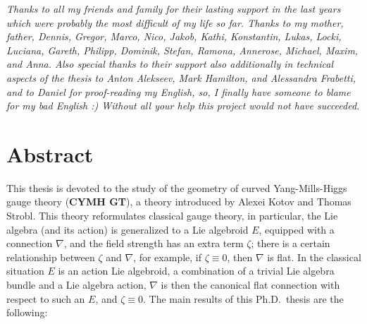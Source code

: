 \documentclass[a4paper,twoside,11pt]{scrbook}
\theoremstyle{plain}
\theoremstyle{remark}
\theoremstyle{definition}
\begin{document}

\newpage
\thispagestyle{empty}
\vspace*{\fill}
\begin{center}
\textit{Thanks to all my friends and family for their lasting support in the last years which were probably the most difficult of my life so far. Thanks to my mother, father, Dennis, Gregor, Marco, Nico, Jakob, Kathi, Konstantin, Lukas, Locki, Luciana, Gareth, Philipp, Dominik, Stefan, Ramona, Annerose, Michael, Maxim, and Anna. Also special thanks to their support also additionally in technical aspects of the thesis to Anton Alekseev, Mark Hamilton, and Alessandra Frabetti, and to Daniel for proof-reading my English, so, I finally have someone to blame for my bad English :) Without all your help this project would not have succeeded.}
\end{center}
\vspace*{\fill}
\normalsize

\newpage

\chapter*{Abstract}
This thesis is devoted to the study of the geometry of curved Yang-Mills-Higgs gauge theory (\textbf{CYMH GT}), a theory introduced by Alexei Kotov and Thomas Strobl. This theory reformulates classical gauge theory, in particular, the Lie algebra (and its action) is generalized to a Lie algebroid $E$, equipped with a connection $\nabla$, and the field strength has an extra term $\zeta$; there is a certain relationship between $\zeta$ and $\nabla$, for example, if $\zeta \equiv 0$, then $\nabla$ is flat. In the classical situation $E$ is an action Lie algebroid, a combination of a trivial Lie algebra bundle and a Lie algebra action, $\nabla$ is then the canonical flat connection with respect to such an $E$, and $\zeta\equiv 0$. The main results of this Ph.D.~thesis are the following:
\end{document}
